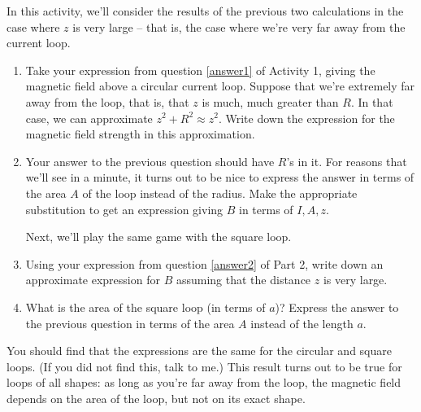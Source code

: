 In this activity, we'll consider the results of the previous
two calculations in the case where $z$ is very large -- that is,
the case where we're very far away from the current loop.

\begin{enumerate}[leftmargin=0in, labelwidth=*, align=left, labelsep=0in, widest=a, itemindent=\labelwidth, label=(\emph{\alph*})]

\item Take your expression from question \ref{answer1} of Activity 1,
giving the magnetic field above a circular current loop.
Suppose that we're extremely far away from the loop, that is,
that $z$ is much, much greater than $R$.  In that case, we can approximate
$z^2+R^2\approx z^2$.  Write down the expression for the magnetic
field strength in this approximation.  
\answerspace{0.7in}

\item Your answer to the previous question should have $R$'s in it.
For reasons that we'll see in a minute, it turns out to be nice
to express the answer in terms of the area $A$ of the loop instead of the
radius.  Make the appropriate substitution to get an expression
giving $B$ in terms of $I,A,z$.
\answerspace{0.7in}

Next, we'll play the same game with the square loop.  

\item Using your expression from question \ref{answer2} of Part 2,
write down an approximate expression for $B$ assuming that the distance
$z$ is very large.
\answerspace{0.7in}

\item What is the area of the square loop (in terms of $a$)?  
Express the answer to the previous question in terms of the area $A$
instead of the length $a$.
\answerspace{0.7in}

\end{enumerate}

You should find that the expressions are the same for the circular
and square loops.  (If you did not find this, talk to me.)
This result turns out to be true for loops of all shapes: as long as you're
far away from the loop, the magnetic field depends on the area of the loop,
but not on its exact shape.


